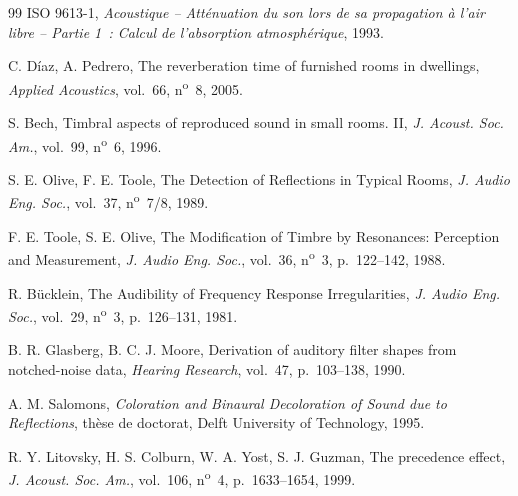 \documentclass[11pt,a4paper]{article}
\begin{document}
\begin{thebibliography}{99}
 ISO 9613-1, \emph{Acoustique -- Atténuation du son lors de sa propagation à l'air
libre -- Partie 1~: Calcul de l'absorption atmosphérique}, 1993.

 C. D\'iaz, A. Pedrero, \og The reverberation time of furnished rooms in
dwellings\fg{}, \emph{Applied Acoustics}, vol.~66, n\textsuperscript{o}~8, 2005.

 S. Bech, \og Timbral aspects of reproduced sound in small rooms. II\fg{}, \emph{J.
Acoust. Soc. Am.}, vol.~99, n\textsuperscript{o}~6, 1996.

 S. E. Olive, F. E. Toole, \og The Detection of Reflections in Typical Rooms\fg{},
\emph{J. Audio Eng. Soc.}, vol.~37, n\textsuperscript{o}~7/8, 1989.

 F. E. Toole, S. E. Olive, \og The Modification of Timbre by Resonances: Perception
and Measurement\fg{}, \emph{J. Audio Eng. Soc.}, vol.~36, n\textsuperscript{o}~3, p.~122--142, 1988.

 R. Bücklein, \og The Audibility of Frequency Response Irregularities\fg{}, \emph{J.
Audio Eng. Soc.}, vol.~29, n\textsuperscript{o}~3, p.~126--131, 1981.

 B. R. Glasberg, B. C. J. Moore, \og Derivation of auditory filter shapes from
notched-noise data\fg{}, \emph{Hearing Research}, vol.~47, p.~103--138, 1990.

 A. M. Salomons, \emph{Coloration and Binaural Decoloration of Sound due to
Reflections}, thèse de doctorat, Delft University of Technology, 1995.

 R. Y. Litovsky, H. S. Colburn, W. A. Yost, S. J. Guzman, \og The precedence
effect\fg{}, \emph{J. Acoust. Soc. Am.}, vol.~106, n\textsuperscript{o}~4, p.~1633--1654, 1999.

\end{thebibliography}
\end{document}
